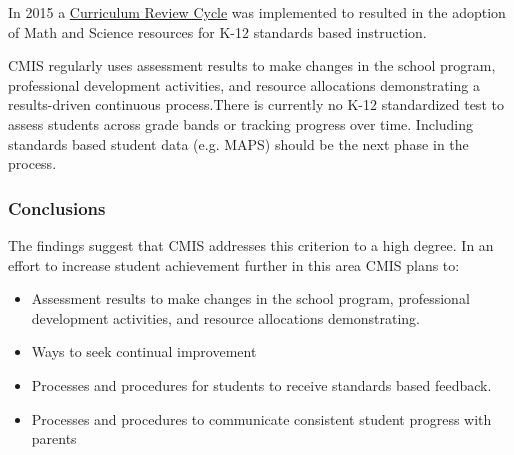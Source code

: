 \begin{findings}
In 2015 a \href{https://docs.google.com/a/cmis.ac.th/document/d/1hh1nLUlJgg1hd7s6aG3u3We0L6o7Wg_ECdjc2f6DcT8/edit?usp=sharing}{Curriculum Review Cycle} was implemented to resulted in the adoption of Math and Science resources for K-12 standards based instruction.


CMIS regularly uses assessment results to make changes in the school program, professional development activities, and resource allocations demonstrating a results-driven continuous process.There is currently no K-12 standardized test to assess students across grade bands or tracking progress over time. Including standards based student data (e.g. MAPS) should be the next phase in the process.  
\end{findings}

\subsubsection{Conclusions}
The findings suggest that CMIS addresses this criterion to a high degree. In an effort to increase student achievement further in this area CMIS plans to:


\begin{itemize}
\item Assessment results to make changes in the school program, professional development activities, and resource allocations demonstrating.
\item Ways to seek continual improvement
\end{itemize}


\begin{itemize}
\item Processes and procedures for students to receive standards based feedback. 
\item Processes and procedures to communicate consistent student progress with parents
\end{itemize}



